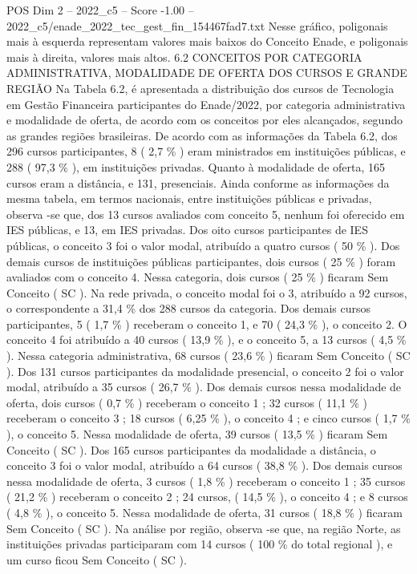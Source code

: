 \begin{textsample}{POS Dim 2 – 2022\_c5 – Score -1.00 – 2022\_c5/enade\_2022\_tec\_gest\_fin\_154467fad7.txt}
Nesse gráfico, poligonais mais à esquerda representam valores mais baixos do Conceito Enade, e poligonais mais à direita, valores mais altos. 6.2 CONCEITOS POR CATEGORIA ADMINISTRATIVA, MODALIDADE DE OFERTA DOS CURSOS E GRANDE REGIÃO Na Tabela 6.2, é apresentada a distribuição dos cursos de Tecnologia em Gestão Financeira participantes do Enade/2022, por categoria administrativa e modalidade de oferta, de acordo com os conceitos por eles alcançados, segundo as grandes regiões brasileiras.
De acordo com as informações da Tabela 6.2, dos 296 cursos participantes, 8 ( 2,7 \% ) eram ministrados em instituições públicas, e 288 ( 97,3 \% ), em instituições privadas.
Quanto à modalidade de oferta, 165 cursos eram a distância, e 131, presenciais.
Ainda conforme as informações da mesma tabela, em termos nacionais, entre instituições públicas e privadas, observa -se que, dos 13 cursos avaliados com conceito 5, nenhum foi oferecido em IES públicas, e 13, em IES privadas.
Dos oito cursos participantes de IES públicas, o conceito 3 foi o valor modal, atribuído a quatro cursos ( 50 \% ).
Dos demais cursos de instituições públicas participantes, dois cursos ( 25 \% ) foram avaliados com o conceito 4.
Nessa categoria, dois cursos ( 25 \% ) ficaram Sem Conceito ( SC ).
Na rede privada, o conceito modal foi o 3, atribuído a 92 cursos, o correspondente a 31,4 \% dos 288 cursos da categoria.
Dos demais cursos participantes, 5 ( 1,7 \% ) receberam o conceito 1, e 70 ( 24,3 \% ), o conceito 2.
O conceito 4 foi atribuído a 40 cursos ( 13,9 \% ), e o conceito 5, a 13 cursos ( 4,5 \% ).
Nessa categoria administrativa, 68 cursos ( 23,6 \% ) ficaram Sem Conceito ( SC ).
Dos 131 cursos participantes da modalidade presencial, o conceito 2 foi o valor modal, atribuído a 35 cursos ( 26,7 \% ).
Dos demais cursos nessa modalidade de oferta, dois cursos ( 0,7 \% ) receberam o conceito 1 ; 32 cursos ( 11,1 \% ) receberam o conceito 3 ; 18 cursos ( 6,25 \% ), o conceito 4 ; e cinco cursos ( 1,7 \% ), o conceito 5.
Nessa modalidade de oferta, 39 cursos ( 13,5 \% ) ficaram Sem Conceito ( SC ).
Dos 165 cursos participantes da modalidade a distância, o conceito 3 foi o valor modal, atribuído a 64 cursos ( 38,8 \% ).
Dos demais cursos nessa modalidade de oferta, 3 cursos ( 1,8 \% ) receberam o conceito 1 ; 35 cursos ( 21,2 \% ) receberam o conceito 2 ; 24 cursos, ( 14,5 \% ), o conceito 4 ; e 8 cursos ( 4,8 \% ), o conceito 5.
Nessa modalidade de oferta, 31 cursos ( 18,8 \% ) ficaram Sem Conceito ( SC ).
Na análise por região, observa -se que, na região Norte, as instituições privadas participaram com 14 cursos ( 100 \% do total regional ), e um curso ficou Sem Conceito ( SC ).

\end{textsample}

